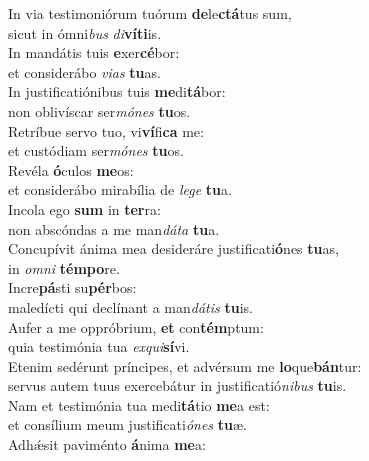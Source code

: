 \evenverse In via testimoniórum tuórum \textbf{de}le\textbf{ctá}tus sum,~\*\\
\evenverse sicut in ómni\textit{bus} \textit{di}\textbf{ví}\textbf{ti}is.\\
\oddverse In mandátis tuis \textbf{e}xer\textbf{cé}bor:~\*\\
\oddverse et considerábo \textit{vi}\textit{as} \textbf{tu}as.\\
\evenverse In justificatiónibus tuis \textbf{me}di\textbf{tá}bor:~\*\\
\evenverse non oblivíscar ser\textit{mó}\textit{nes} \textbf{tu}os.\\
\oddverse Retríbue servo tuo, vi\textbf{ví}fi\textbf{ca} me:~\*\\
\oddverse et custódiam ser\textit{mó}\textit{nes} \textbf{tu}os.\\
\evenverse Revéla \textbf{ó}culos \textbf{me}os:~\*\\
\evenverse et considerábo mirabília de \textit{le}\textit{ge} \textbf{tu}a.\\
\oddverse Incola ego \textbf{sum} in \textbf{ter}ra:~\*\\
\oddverse non abscóndas a me man\textit{dá}\textit{ta} \textbf{tu}a.\\
\evenverse Concupívit ánima mea desideráre justificati\textbf{ó}nes \textbf{tu}as,~\*\\
\evenverse in \textit{om}\textit{ni} \textbf{tém}\textbf{po}re.\\
\oddverse Incre\textbf{pá}sti su\textbf{pér}bos:~\*\\
\oddverse maledícti qui declínant a man\textit{dá}\textit{tis} \textbf{tu}is.\\
\evenverse Aufer a me oppróbrium, \textbf{et} con\textbf{tém}ptum:~\*\\
\evenverse quia testimónia tua \textit{ex}\textit{qui}\textbf{sí}vi.\\
\oddverse Etenim sedérunt príncipes, et advérsum me \textbf{lo}que\textbf{bán}tur:~\*\\
\oddverse servus autem tuus exercebátur in justificatió\textit{ni}\textit{bus} \textbf{tu}is.\\
\evenverse Nam et testimónia tua medi\textbf{tá}tio \textbf{me}a est:~\*\\
\evenverse et consílium meum justificati\textit{ó}\textit{nes} \textbf{tu}æ.\\
\oddverse Adhǽsit paviménto \textbf{á}nima \textbf{me}a:~\*\\
